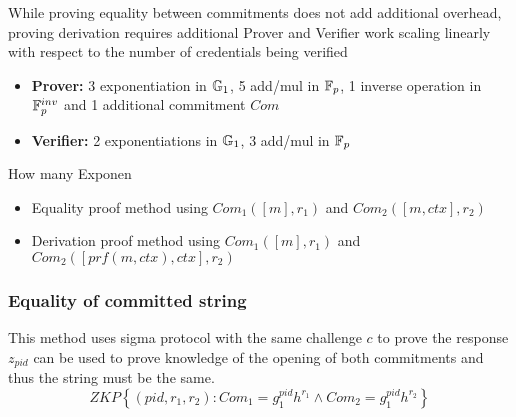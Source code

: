 While proving equality between commitments does not add additional overhead, proving derivation requires additional Prover and Verifier work scaling linearly with respect to the number of credentials being verified
\begin{itemize}
    \item \textbf{Prover:} 3 exponentiation in $\mathbb{G}_1$, 5 add/mul in $\mathbb{F}_p$, 1 inverse operation in $\mathbb{F}_p^{inv}$ and 1 additional commitment $Com$
    \item \textbf{Verifier:} 2 exponentiations in $\mathbb{G}_1$, 3 add/mul in $\mathbb{F}_p$
\end{itemize}How many Exponen

\begin{itemize}
    \item Equality proof method using $Com_1([m],r_1)$ and $Com_2([m,ctx],r_2)$
    \item Derivation proof method using $Com_1([m],r_1)$ and $Com_2([prf(m,ctx),ctx],r_2)$
\end{itemize}


\subsubsection{Equality of committed string}
This method uses sigma protocol with the same challenge $c$ to prove the response $z_{pid}$ can be used to prove knowledge of the opening of both commitments and thus the string must be the same.
\[
ZKP
    \left\{ 
    (pid, r_1, r_2): Com_1 = g_1^{pid} h^{r_1} \wedge Com_2 = g_1^{pid} h^{r_2}
    \right\}
\]


